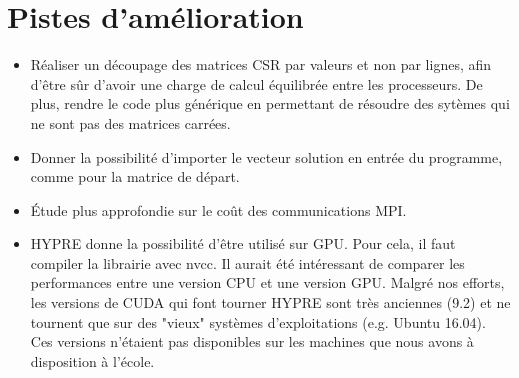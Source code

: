 \documentclass[10pt,twocolumn,letterpaper]{article}
\begin{document}
\section*{Pistes d'amélioration}

\begin{itemize}
  \item Réaliser un découpage des matrices CSR par valeurs et non
par lignes, afin d'être sûr d'avoir une charge de calcul équilibrée entre les
processeurs. De plus, rendre le code plus générique en permettant de résoudre
des sytèmes qui ne sont pas des matrices carrées.
  \item Donner la possibilité d'importer le vecteur solution en
entrée du programme, comme pour la matrice de départ.
  \item Étude plus approfondie sur le coût des communications MPI.
  \item HYPRE donne la possibilité d'être utilisé sur GPU. Pour
cela, il faut compiler la librairie avec nvcc. Il aurait été intéressant de
comparer les performances entre une version CPU et une version GPU. Malgré nos
efforts, les versions de CUDA qui font tourner HYPRE sont très anciennes (9.2)
et ne tournent que sur des "vieux" systèmes d'exploitations (e.g. Ubuntu 16.04).
Ces versions n'étaient pas disponibles sur les machines que nous avons à
disposition à l'école.
\end{itemize}


\end{document}
